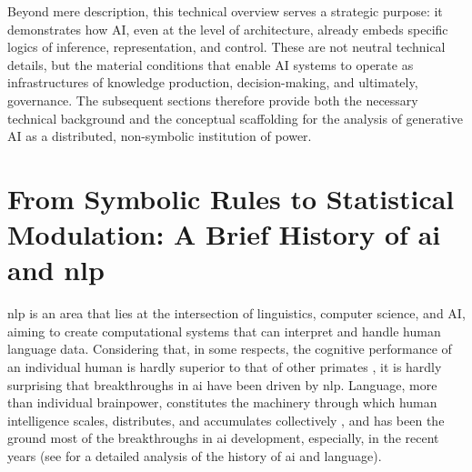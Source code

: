 Beyond mere description, this technical overview serves a strategic purpose: it demonstrates how AI, even at the level of architecture, already embeds specific logics of inference, representation, and control. These are not neutral technical details, but the material conditions that enable AI systems to operate as infrastructures of knowledge production, decision-making, and ultimately, governance. The subsequent sections therefore provide both the necessary technical background and the conceptual scaffolding for the analysis of generative AI as a distributed, non-symbolic institution of power.





\section{From Symbolic Rules to Statistical Modulation: A Brief History of \gls{ai}  and \gls{nlp} }

\greensquare
\Gls{nlp} is an area that lies at the intersection of linguistics, computer science, and AI, aiming to create computational systems that can interpret and handle human language data. Considering that, in some respects, the cognitive performance of an individual human is hardly superior to that of other primates \parencite[127]{manning2022a}, it is hardly surprising that breakthroughs in \gls{ai} have been driven by \gls{nlp}. Language, more than individual brainpower, constitutes the machinery through which human intelligence scales, distributes, and accumulates collectively \parencite[127]{manning2022a}, and has been the ground most of the breakthroughs in \gls{ai} development, especially, in the recent years (see \cite[22ff]{bommasani2022a} for a detailed analysis of the history of \gls{ai} and language).

